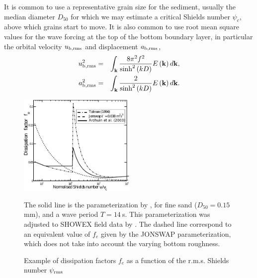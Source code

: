 It is common to use a representative grain size for the sediment, usually the median 
diameter 
$D_{50}$ for which we may estimate a critical Shields number $\psi _{c}$, above which grains start to move. It is also 
common to use root mean square values for the wave forcing at the top of the bottom boundary layer, in particular the 
orbital velocity $u_{\rm b,rms}$ and displacement $a_{\rm b,rms}$,
\begin{eqnarray}
\label{abandub}
u_{\rm b,rms}^{2} &=&\int_{{\mathbf k}}\frac{8\upi ^{2}f^{2}}{\sinh ^{2}\left(
kD\right) }E\left( {\mathbf k}\right) d{\mathbf k},    \label{ub}
\\
a_{\rm b,rms}^{2} &=&\int_{{\mathbf k}}\frac{2}{\sinh ^{2}\left( kD\right) }%
E\left( {\mathbf k}\right) d{\mathbf k}.    \label{ab}
\end{eqnarray}
\begin{figure}[htb]
\centerline{\includegraphics[width=0.5\textwidth]{FIGS_CH_BBL/aho2001_fig3.pdf}}
  \caption{Example of dissipation factors $f_{e}$ as a function of the r.m.s. Shields
number $\psi_{\rm rms}$} {The solid line is the parameterization by \cite{Tolman1994}, for fine sand ($D_{50}=0.15~$mm), and a wave period
 $T=14~$s. This parameterization was adjusted to SHOWEX field data by  \cite{Ardhuin&al.2003b}. 
The dashed line correspond to an equivalent value of $f_{e}$ given by the JONSWAP parameterization, which does not 
take into account the varying bottom roughness.} \label{fig fe from psi}
\end{figure}

